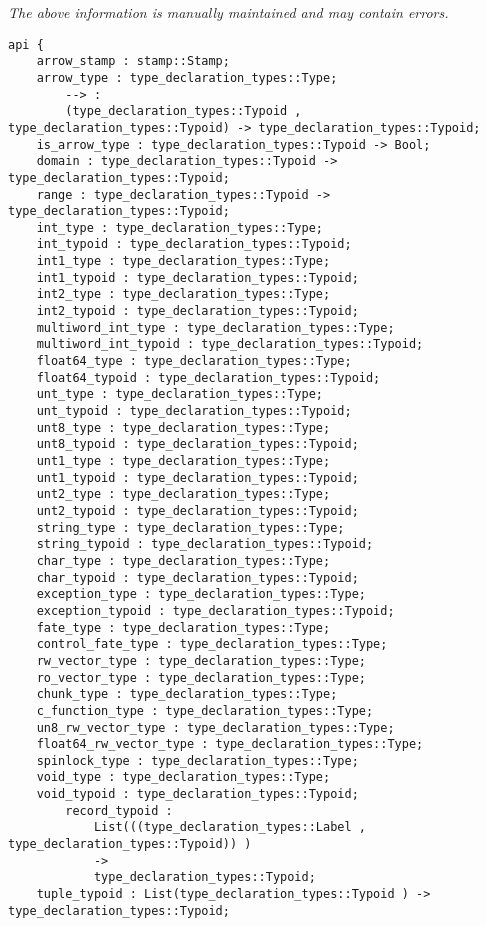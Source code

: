 \label{api:More\_Type\_Types}

{\tiny \it The above information is manually maintained and may contain errors.}
\begin{verbatim}
api {
    arrow_stamp : stamp::Stamp;
    arrow_type : type_declaration_types::Type;
        --> :
        (type_declaration_types::Typoid , type_declaration_types::Typoid) -> type_declaration_types::Typoid;
    is_arrow_type : type_declaration_types::Typoid -> Bool;
    domain : type_declaration_types::Typoid -> type_declaration_types::Typoid;
    range : type_declaration_types::Typoid -> type_declaration_types::Typoid;
    int_type : type_declaration_types::Type;
    int_typoid : type_declaration_types::Typoid;
    int1_type : type_declaration_types::Type;
    int1_typoid : type_declaration_types::Typoid;
    int2_type : type_declaration_types::Type;
    int2_typoid : type_declaration_types::Typoid;
    multiword_int_type : type_declaration_types::Type;
    multiword_int_typoid : type_declaration_types::Typoid;
    float64_type : type_declaration_types::Type;
    float64_typoid : type_declaration_types::Typoid;
    unt_type : type_declaration_types::Type;
    unt_typoid : type_declaration_types::Typoid;
    unt8_type : type_declaration_types::Type;
    unt8_typoid : type_declaration_types::Typoid;
    unt1_type : type_declaration_types::Type;
    unt1_typoid : type_declaration_types::Typoid;
    unt2_type : type_declaration_types::Type;
    unt2_typoid : type_declaration_types::Typoid;
    string_type : type_declaration_types::Type;
    string_typoid : type_declaration_types::Typoid;
    char_type : type_declaration_types::Type;
    char_typoid : type_declaration_types::Typoid;
    exception_type : type_declaration_types::Type;
    exception_typoid : type_declaration_types::Typoid;
    fate_type : type_declaration_types::Type;
    control_fate_type : type_declaration_types::Type;
    rw_vector_type : type_declaration_types::Type;
    ro_vector_type : type_declaration_types::Type;
    chunk_type : type_declaration_types::Type;
    c_function_type : type_declaration_types::Type;
    un8_rw_vector_type : type_declaration_types::Type;
    float64_rw_vector_type : type_declaration_types::Type;
    spinlock_type : type_declaration_types::Type;
    void_type : type_declaration_types::Type;
    void_typoid : type_declaration_types::Typoid;
        record_typoid :
            List(((type_declaration_types::Label , type_declaration_types::Typoid)) )
            ->
            type_declaration_types::Typoid;
    tuple_typoid : List(type_declaration_types::Typoid ) -> type_declaration_types::Typoid;

\end{verbatim}
